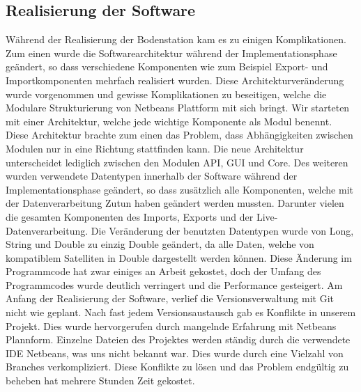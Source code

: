 \subsection{Realisierung der Software}
Während der Realisierung der Bodenstation kam es zu einigen Komplikationen. Zum einen wurde die Softwarearchitektur während der Implementationsphase geändert, so dass verschiedene Komponenten wie zum Beispiel Export- und Importkomponenten mehrfach realisiert wurden. Diese Architekturveränderung wurde vorgenommen und gewisse Komplikationen zu beseitigen, welche die Modulare Strukturierung von Netbeans Plattform mit sich bringt. Wir starteten mit einer Architektur, welche jede wichtige Komponente als Modul benennt. Diese Architektur brachte zum einen das Problem, dass Abhängigkeiten zwischen Modulen nur in eine Richtung stattfinden kann. Die neue Architektur unterscheidet lediglich zwischen den Modulen API, GUI und Core. Des weiteren wurden verwendete Datentypen innerhalb der Software während der Implementationsphase geändert, so dass zusätzlich alle Komponenten, welche mit der Datenverarbeitung Zutun haben geändert werden mussten. Darunter vielen die gesamten Komponenten des Imports, Exports und der Live-Datenverarbeitung. Die Veränderung der benutzten Datentypen wurde von Long, String und Double zu einzig Double geändert, da alle Daten, welche von kompatiblem Satelliten in Double dargestellt werden können. Diese Änderung im Programmcode hat zwar einiges an Arbeit gekostet, doch der Umfang des Programmcodes wurde deutlich verringert und die Performance gesteigert. Am Anfang der Realisierung der Software, verlief die Versionsverwaltung mit Git nicht wie geplant. Nach fast jedem Versionsaustausch gab es Konflikte in unserem Projekt. Dies wurde hervorgerufen durch mangelnde Erfahrung mit Netbeans Plannform. Einzelne Dateien des Projektes werden ständig durch die verwendete IDE Netbeans, was uns nicht bekannt war. Dies wurde durch eine Vielzahl von Branches verkompliziert. Diese Konflikte zu lösen und das Problem endgültig zu beheben hat mehrere Stunden Zeit gekostet.
